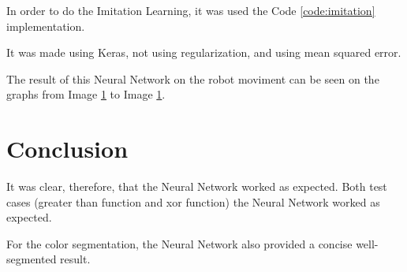 \documentclass[journal]{IEEEtran}
\begin{document}
In order to do the Imitation Learning, it was used the Code \ref{code:imitation} implementation.

It was made using Keras, not using regularization, and using mean squared error.

The result of this Neural Network on the robot moviment can be seen on the graphs from Image \ref{} to Image \ref{}.

%
%

\section {Conclusion}

It was clear, therefore, that the Neural Network worked as expected. Both test cases (greater than function and xor function) the Neural Network worked as expected.

For the color segmentation, the Neural Network also provided a concise well-segmented result.

\vfill
\end{document}

